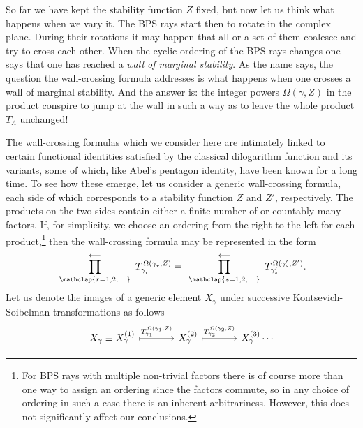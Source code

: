 \documentclass[11pt]{amsart}
\theoremstyle{remark}
\theoremstyle{remark}
\theoremstyle{definition}
\theoremstyle{definition}
\theoremstyle{definition}
\newcommand{\0}{{\scriptstyle 0'}} %
\newcommand{\1}{{\scriptstyle 1'}}
\newcommand{\pt}{\hspace{1pt}} %
\begin{document}
So far we have kept the stability function $Z$ fixed, but now let us think what happens when we vary it. The BPS rays start then to rotate in the complex plane. During their rotations it may happen that all or a set of them coalesce and try to cross each other. When the cyclic ordering of the BPS rays changes one says that one has reached a \textit{wall of marginal stability}. As the name says, the question the wall-crossing formula addresses is what happens when one crosses a wall of marginal stability. And the answer is: the integer powers $\Omega(\gamma,Z)$ in the product conspire to jump at the wall in such a way as to leave the whole product $T_{\Lambda}$ unchanged! \cite{Kontsevich:2008fj}

The wall-crossing formulas which we consider here are intimately linked to certain functional identities satisfied by the classical dilogarithm function and its variants, some of which, like Abel's pentagon identity, have been known for a long time. To see how these emerge, let us consider a generic wall-crossing formula, each side of which corresponds to a stability function $Z$ and $Z'$, respectively. The products on the two sides contain either a finite number of or countably many factors. If, for simplicity, we choose an ordering from the right to the left for each product,\footnote{\pt For BPS rays with multiple non-trivial factors there is of course more than one way to assign an ordering since the factors commute, so in any choice of ordering in such a case there is an inherent arbitrariness. However, this does not significantly affect our conclusions.} then the wall-crossing formula may be represented in the form
\begin{equation}
\prod^{\longleftarrow}_{\mathclap{ r = 1, 2, \dots }} \ T_{\smash{\gamma^{\phantom{'}}_r}}^{\pt \Omega(\gamma^{\phantom{'}}_r,Z)} 
=
\ \pt \prod^{\longleftarrow}_{\mathclap{ s = 1,2, \dots }} \ T_{\gamma'_{\smash{s}}}^{\pt \smash{\Omega(\gamma'_{\smash{s}},Z')}} \rlap{.}
\end{equation}
Let us denote the images of a generic element $X_{\gamma}$ under successive Kontsevich-Soibelman transformations as follows
\begin{equation}
\begin{tikzcd}[column sep = large]
X_{\gamma} \equiv X^{(1)}_{\gamma} \rar[mapsto, "T^{\pt \Omega(\gamma_1,Z)}_{\gamma_1}"] 
& X^{(2)}_{\gamma} \rar[mapsto, "T^{\pt \Omega(\gamma_2,Z)}_{\gamma_2}"]
& X^{(3)}_{\gamma} \cdots
\end{tikzcd}
\end{equation}
\end{document}
